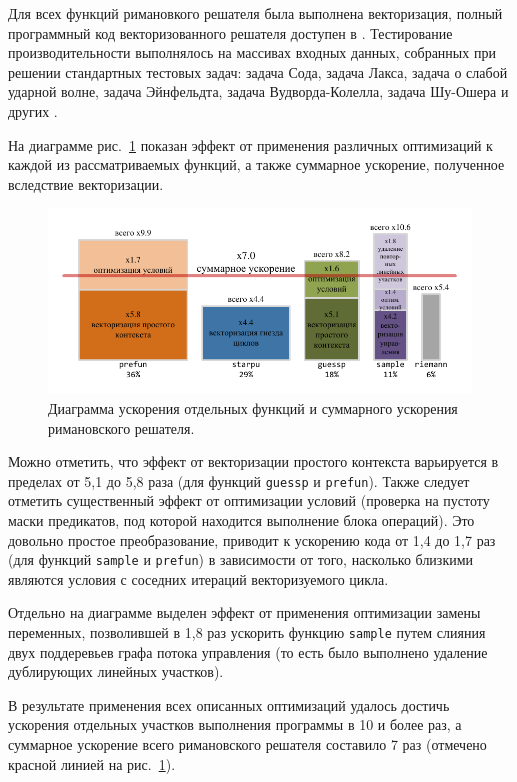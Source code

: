 Для всех функций римановкого решателя была выполнена векторизация, полный программный код векторизованного решателя доступен в \cite{riemannvecGithub}.
Тестирование производительности выполнялось на массивах входных данных, собранных при решении стандартных тестовых задач: задача Сода, задача Лакса, задача о слабой ударной волне, задача Эйнфельдта, задача Вудворда-Колелла, задача Шу-Ошера и других \cite{Bulat2015VecRiemann}.

На диаграмме рис.~\ref{fig:text_4_vec_riemann_perf} показан эффект от применения различных оптимизаций к каждой из рассматриваемых функций, а также суммарное ускорение, полученное вследствие векторизации.

\begin{figure}
\centering
\includegraphics[width=1.0\textwidth]{pics/text_4_vec_riemann/pic_perf.pdf}
\singlespacing
{}\caption{Диаграмма ускорения отдельных функций и суммарного ускорения римановского решателя.}
\label{fig:text_4_vec_riemann_perf}
\end{figure}

Можно отметить, что эффект от векторизации простого контекста варьируется в пределах от 5,1 до 5,8 раза (для функций \texttt{guessp} и \texttt{prefun}).
Также следует отметить существенный эффект от оптимизации условий (проверка на пустоту маски предикатов, под которой находится выполнение блока операций).
Это довольно простое преобразование, приводит к ускорению кода от 1,4 до 1,7 раз (для функций \texttt{sample} и \texttt{prefun}) в зависимости от того, насколько близкими являются условия с соседних итераций векторизуемого цикла.

Отдельно на диаграмме выделен эффект от применения оптимизации замены переменных, позволившей в 1,8 раз ускорить функцию \texttt{sample} путем слияния двух поддеревьев графа потока управления\label{term:graph_cfg3} (то есть было выполнено удаление дублирующих линейных участков).

В результате применения всех описанных оптимизаций удалось достичь ускорения отдельных участков выполнения программы в 10 и более раз, а суммарное ускорение всего римановского решателя составило 7 раз (отмечено красной линией на рис.~\ref{fig:text_4_vec_riemann_perf}).


